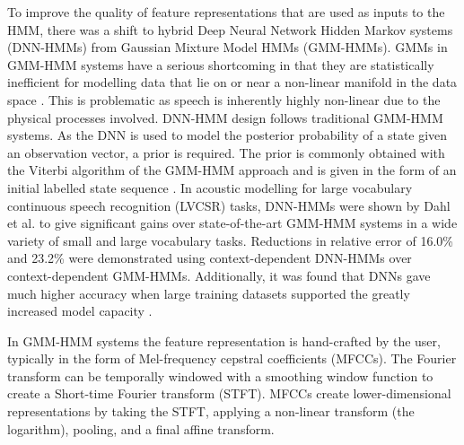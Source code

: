 \documentclass[12pt]{llncs}
\begin{document}
To improve the quality of feature representations that are used as inputs to the HMM, there was a shift to hybrid Deep Neural Network Hidden Markov systems (DNN-HMMs) from Gaussian Mixture Model HMMs (GMM-HMMs). GMMs in GMM-HMM systems have a serious shortcoming in that they are statistically inefficient for modelling data that lie on or near a non-linear manifold in the data space \cite{hinton2012deep}. This is problematic as speech is inherently highly non-linear due to the physical processes involved. DNN-HMM design follows traditional GMM-HMM systems. As the DNN is used to model the posterior probability of a state given an observation vector, a prior is required. The prior is commonly obtained with the Viterbi algorithm of the GMM-HMM approach and is given in the form of an initial labelled state sequence \cite{li2013hybrid}. In acoustic modelling for large vocabulary continuous speech recognition (LVCSR) tasks, DNN-HMMs were shown by Dahl et al. \cite{dahl2012context} to give significant gains over state-of-the-art GMM-HMM systems in a wide variety of small and large vocabulary tasks. Reductions in relative error of 16.0\% and 23.2\% were demonstrated using context-dependent DNN-HMMs over context-dependent GMM-HMMs. Additionally, it was found that DNNs gave much higher accuracy when large training datasets supported the greatly increased model capacity \cite{deng2014achievements}.

In GMM-HMM systems the feature representation is hand-crafted by the user, typically in the form of Mel-frequency cepstral coefficients (MFCCs). The Fourier transform can be temporally windowed with a smoothing window function to create a Short-time Fourier transform (STFT). MFCCs create lower-dimensional representations by taking the STFT, applying a non-linear transform (the logarithm), pooling, and a final affine transform. 
\end{document}
